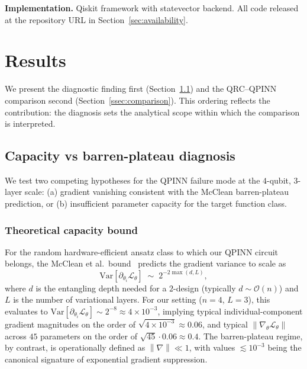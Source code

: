\documentclass[11pt,a4paper]{article}
\newcommand{\norm}[1]{\left\lVert#1\right\rVert}
\begin{document}
\textbf{Implementation.} Qiskit framework with statevector backend.
All code released at the repository URL in
Section~\ref{sec:availability}.

\section{Results}
\label{sec:results}

We present the diagnostic finding first (Section~\ref{ssec:diagnosis})
and the QRC--QPINN comparison second (Section~\ref{ssec:comparison}).
This ordering reflects the contribution: the diagnosis sets the
analytical scope within which the comparison is interpreted.

\subsection{Capacity vs barren-plateau diagnosis}
\label{ssec:diagnosis}

We test two competing hypotheses for the QPINN failure mode at the
$4$-qubit, $3$-layer scale: (a) gradient vanishing consistent with
the McClean barren-plateau prediction, or (b) insufficient
parameter capacity for the target function class.

\subsubsection{Theoretical capacity bound}

For the random hardware-efficient ansatz class to which our QPINN
circuit belongs, the McClean et al.\ bound~\cite{mcclean2018}
predicts the gradient variance to scale as
\begin{equation}
  \mathrm{Var}\!\left[\partial_{\theta_i} \mathcal{L}_\theta\right]
  \;\sim\; 2^{-2 \max(d, L)},
\end{equation}
where $d$ is the entangling depth needed for a $2$-design (typically
$d \sim \mathcal{O}(n)$) and $L$ is the number of variational layers.
For our setting ($n = 4$, $L = 3$), this evaluates to
$\mathrm{Var}\!\left[\partial_{\theta_i} \mathcal{L}_\theta\right] \sim 2^{-8} \approx 4 \times 10^{-3}$,
implying typical individual-component gradient magnitudes on the
order of $\sqrt{4 \times 10^{-3}} \approx 0.06$, and typical
$\norm{\nabla_\theta \mathcal{L}_\theta}$ across $45$ parameters on the
order of $\sqrt{45} \cdot 0.06 \approx 0.4$.
The barren-plateau regime, by contrast, is operationally defined as
$\norm{\nabla} \ll 1$, with values $\lesssim 10^{-3}$ being the
canonical signature of exponential gradient suppression.
\end{document}
